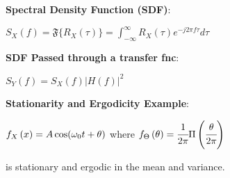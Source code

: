 \documentclass{article}
\newcommand{\sect}[1]{\noindent\textbf{#1}:}
\begin{document}
\begin{small}
\begin{multicols*}{2}
		\sect{Spectral Density Function (SDF)}
		
		$S_X(f) = \mathfrak{F}\{R_X(\tau)\} = \int^\infty_{-\infty} R_X(\tau)e^{-j2\pi f \tau} d\tau$
		
		\sect{SDF Passed through a transfer fnc}
		
		$S_Y(f) = S_X(f)|H(f)|^2$
		
		\sect{Stationarity and Ergodicity Example}
		
		$\pdf[X][x] = A \cos(\omega_0 t + \theta)$ where $\pdf[\Theta][\theta] = \cfrac{1}{2\pi} \Pi\left(\cfrac{\theta}{2\pi}\right)$
		
		\noindent is stationary and ergodic in the mean and variance.
		
	\end{multicols*}
	\end{small}
\end{document}
